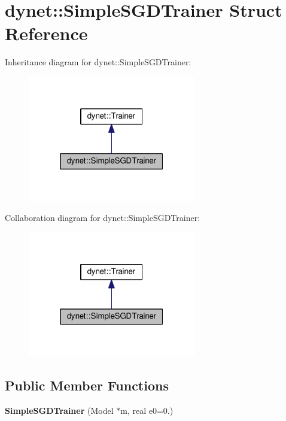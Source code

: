 \hypertarget{structdynet_1_1SimpleSGDTrainer}{}\section{dynet\+:\+:Simple\+S\+G\+D\+Trainer Struct Reference}
\label{structdynet_1_1SimpleSGDTrainer}


Inheritance diagram for dynet\+:\+:Simple\+S\+G\+D\+Trainer\+:\nopagebreak
\begin{figure}[H]
\begin{center}
\leavevmode
\includegraphics[width=208pt]{structdynet_1_1SimpleSGDTrainer__inherit__graph}
\end{center}
\end{figure}


Collaboration diagram for dynet\+:\+:Simple\+S\+G\+D\+Trainer\+:\nopagebreak
\begin{figure}[H]
\begin{center}
\leavevmode
\includegraphics[width=208pt]{structdynet_1_1SimpleSGDTrainer__coll__graph}
\end{center}
\end{figure}
\subsection*{Public Member Functions}
\begin{DoxyCompactItemize}
\item 
\hypertarget{structdynet_1_1SimpleSGDTrainer_ac3d5dd3f59db29f7d803130f874f9832}{}{\bfseries Simple\+S\+G\+D\+Trainer} (Model $\ast$m, real e0=0.)\label{structdynet_1_1SimpleSGDTrainer_ac3d5dd3f59db29f7d803130f874f9832}

\end{DoxyCompactItemize}
